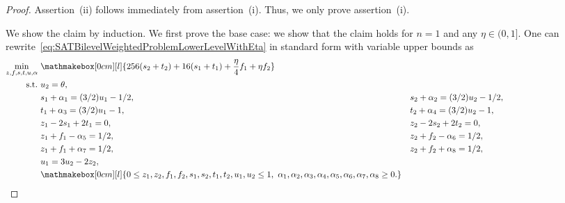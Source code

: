 \documentclass[runningheads,orivec]{llncs}
\newcommand{\MacroColor}[1]{#1}
\newcommand{\NVariables}{\MacroColor{n}}
\newcommand{\SATBooleanFormula}{\MacroColor{F}}
\newcommand{\ReformZ}{\MacroColor{z}}
\newcommand{\ReformAugFrac}{\MacroColor{f}}
\newcommand{\ReformPen}{\MacroColor{e}}
\newcommand{\LexLVarS}{\MacroColor{s}}
\newcommand{\LexLVarT}{\MacroColor{t}}
\newcommand{\LexLVarU}{\MacroColor{u}}
\newcommand{\LexWeightValue}{\MacroColor{16}}
\begin{document}
\begin{appendix}
\begin{proof}
Assertion~(ii) follows immediately from assertion~(i).
Thus, we only prove assertion~(i).

We show the claim by induction.
We first prove the base case: we show that the claim holds for $\NVariables = 1$ and any $\eta \in (0, 1]$.
One can rewrite~\eqref{eq:SATBilevelWeightedProblemLowerLevelWithEta} in standard form with variable upper bounds as
\begin{align}
\min_{\ReformZ, \ReformAugFrac, \LexLVarS, \LexLVarT, \LexLVarU, \alpha} \ &
\mathmakebox[0cm][l]{
256 (\LexLVarS_2 + \LexLVarT_2)
+
\LexWeightValue (\LexLVarS_1 + \LexLVarT_1)
+ 
\frac{\eta}{4} \ReformAugFrac_1
+ 
\eta \ReformAugFrac_2
}
\label{eq:emma:LexToWeighted:BaseCase:StandardForm}
\\
\text{s.t.} \
&
\LexLVarU_{2} = \theta,
\notag
\\
&
\LexLVarS_1 + \alpha_1 = (3/2) \LexLVarU_{1} - 1/2,
\quad
&&
\LexLVarS_2 + \alpha_2 = (3/2) \LexLVarU_{2} - 1/2,
\notag
\\
&
\LexLVarT_1 + \alpha_3 = (3/2) \LexLVarU_{1} - 1,
\quad
&&
\LexLVarT_2 + \alpha_4 = (3/2) \LexLVarU_{2} - 1,
&&
\notag
\\
&
z_1 - 2 \LexLVarS_1 + 2 \LexLVarT_1 = 0,
&&
z_2 - 2 \LexLVarS_2 + 2 \LexLVarT_2 = 0,
\notag \\
&
z_1 + \ReformAugFrac_1 - \alpha_5 = 1/2, 
&&
z_2 + \ReformAugFrac_2 - \alpha_6 = 1/2, 
&&
\notag \\
&
z_1 + \ReformAugFrac_1 + \alpha_7 = 1/2, 
&&
z_2 + \ReformAugFrac_2 + \alpha_8 = 1/2, 
\hspace{12em}
\notag \\
&
\LexLVarU_1 = 3 \LexLVarU_2 - 2 \ReformZ_2,
\notag \\
&
\mathmakebox[0cm][l]{
0 \le 
\ReformZ_1, \ReformZ_2, \ReformAugFrac_1, \ReformAugFrac_2, \LexLVarS_1, \LexLVarS_2, \LexLVarT_1, \LexLVarT_2, \LexLVarU_1, \LexLVarU_2 
\le 1, 
\
\alpha_1, \alpha_2, \alpha_3, \alpha_4, \alpha_5, \alpha_6, \alpha_7, \alpha_8 \ge 0.
}
\notag
\end{align}

\end{proof}
\end{appendix}
\end{document}
